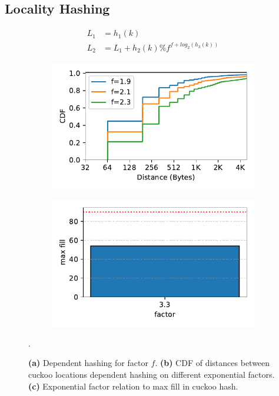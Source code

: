 \subsection{Locality Hashing}
\begin{figure}[t]
    \centering
    \begin{subfigure}{0.3\linewidth}
        \begin{align*}
            L_1 &= h_1(k) \\
            L_2 &= L_1 + h_2(k) \% f^{f + log_2(h_3(k))}
        \end{align*}
        \label{fig:hash_factor}
    \end{subfigure}
    \begin{subfigure}{0.3\linewidth}
        \includegraphics[width=0.99\linewidth]{fig/hash_factor.pdf}
        \label{fig:hash_factor}
    \end{subfigure}
    \begin{subfigure}{0.3\linewidth}
        \includegraphics[width=0.99\linewidth]{fig/hash_fill.pdf}
        \label{fig:hash_fill}
    \end{subfigure}.
    \vspace{-1em}
    \caption{
    \textbf{(a)} Dependent hashing for factor $f$.
    \textbf{(b)} CDF of distances between cuckoo locations dependent hashing on different exponential factors.
    \textbf{(c)} Exponential factor relation to max fill in cuckoo hash.
    }
    \label{fig:locality-hashing}

\end{figure}


